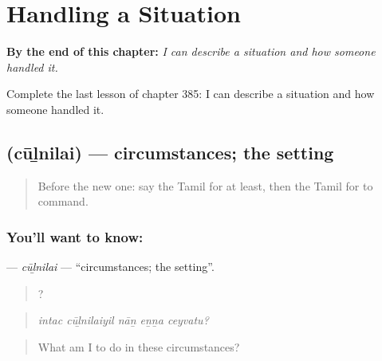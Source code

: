 
\chapter{Handling a Situation}
\label{ch:ta-handling-a-situation}

\begin{chapteropening}
\textbf{By the end of this chapter:} \emph{I can describe a situation and how someone handled it.}

Complete the last lesson of chapter 385: I can describe a situation and how someone handled it.
\end{chapteropening}

\section[\texorpdfstring{\ta{சூழ்நிலை} (cūḻnilai)}{சூழ்நிலை (cūḻnilai)}]{ (cūḻnilai) — circumstances; the setting}

\label{lesson:TA-C385-culnilai}



\begin{quote}
Before the new one: say the Tamil for at least, then the Tamil for to command.
\end{quote}

\subsection*{You'll want to know: }
\textbf{} — \emph{cūḻnilai} — \textquotedblleft{}circumstances; the setting\textquotedblright{}.

\begin{quote}
    ?
\end{quote}

\begin{quote}
\emph{intac cūḻnilaiyil nāṉ eṉṉa ceyvatu?}
\end{quote}

\begin{quote}
What am I to do in these circumstances?
\end{quote}

